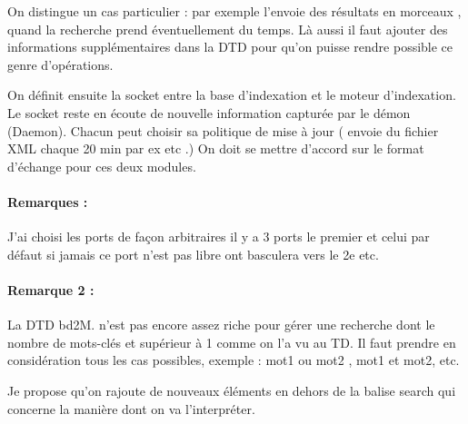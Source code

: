 On distingue un cas particulier : par exemple l'envoie des résultats en morceaux , quand la recherche prend éventuellement du temps. 
Là aussi il faut ajouter des informations supplémentaires dans la DTD pour qu'on puisse rendre possible ce genre d'opérations.

On définit ensuite la socket entre la base d'indexation et le moteur d'indexation. Le socket reste en écoute de nouvelle information capturée par le démon
(Daemon). Chacun peut choisir sa politique de mise à jour ( envoie du fichier XML chaque 20 min par ex etc .) 
On doit se mettre d'accord sur le format d'échange pour ces deux modules. 

\paragraph{Remarques :} J'ai choisi les ports de façon arbitraires il y a 3 ports le premier et celui par défaut 
si jamais ce port n'est pas libre ont basculera vers le 2e etc. 

\paragraph{Remarque 2 :} La DTD bd2M. n'est pas encore assez riche pour gérer une recherche dont le nombre 
de mots-clés et supérieur à 1 comme on l'a vu au TD. Il faut prendre en considération tous les cas possibles, exemple :
mot1 ou mot2 , mot1 et mot2, etc. 

Je propose qu'on rajoute de nouveaux éléments en dehors de la balise search qui concerne la manière dont on va l'interpréter.